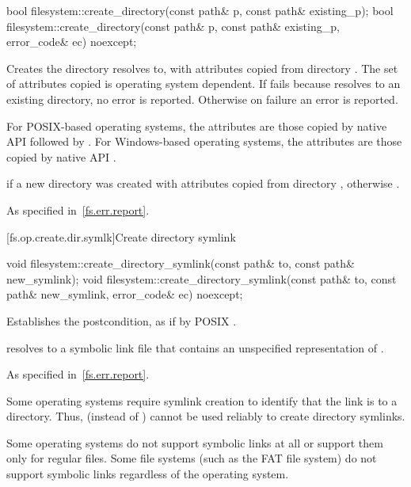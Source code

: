 %
\begin{itemdecl}
bool filesystem::create_directory(const path& p, const path& existing_p);
bool filesystem::create_directory(const path& p, const path& existing_p, error_code& ec) noexcept;
\end{itemdecl}

\begin{itemdescr}
\pnum
\effects
Creates the
  directory  resolves to, with
  attributes copied from directory . The set of attributes
  copied is operating system dependent.
  If  fails because  resolves to an existing directory,
  no error is reported. Otherwise on failure an error is reported.
\begin{note}
For POSIX-based operating systems, the
      attributes are those copied by native API 
      followed by . For
      Windows-based operating systems, the attributes are those copied by native
      API .
\end{note}

\pnum
\returns
{} if a new directory was created
  with attributes copied from directory ,
  otherwise .

\pnum
\throws
As specified in~\ref{fs.err.report}.
\end{itemdescr}


[fs.op.create.dir.symlk]{Create directory symlink}

%
\begin{itemdecl}
void filesystem::create_directory_symlink(const path& to, const path& new_symlink);
void filesystem::create_directory_symlink(const path& to, const path& new_symlink,
                                          error_code& ec) noexcept;
\end{itemdecl}

\begin{itemdescr}
\pnum
\effects
Establishes the postcondition, as if by POSIX .

\pnum
\ensures
{} resolves to a symbolic link file that
  contains an unspecified representation of .

\pnum
\throws
As specified in~\ref{fs.err.report}.

\pnum
\begin{note}
Some operating systems require symlink creation to
identify that the link is to a directory.
Thus,  (instead of )
cannot be used reliably to create directory symlinks.
\end{note}

\pnum
\begin{note}
Some operating systems do not support symbolic links at all or support
  them only for regular files.
  Some file systems (such as the FAT file system) do not
  support
  symbolic links regardless of the operating system.
\end{note}
\end{itemdescr}

